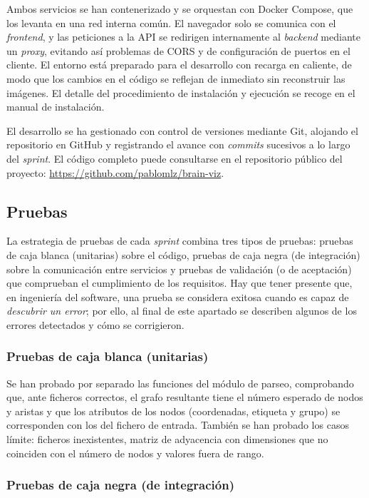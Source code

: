 Ambos servicios se han contenerizado y se orquestan con Docker Compose, que los levanta en una red
interna común. El navegador solo se comunica con el \textit{frontend}, y las peticiones a la API se
redirigen internamente al \textit{backend} mediante un \textit{proxy}, evitando así problemas de
CORS y de configuración de puertos en el cliente. El entorno está preparado para el desarrollo con
recarga en caliente, de modo que los cambios en el código se reflejan de inmediato sin reconstruir las
imágenes. El detalle del procedimiento de instalación y ejecución se recoge en el manual de
instalación.

El desarrollo se ha gestionado con control de versiones mediante Git, alojando el repositorio en
GitHub y registrando el avance con \textit{commits} sucesivos a lo largo del \textit{sprint}. El
código completo puede consultarse en el repositorio público del proyecto:
\url{https://github.com/pablomlz/brain-viz}.

\subsection{Pruebas}

La estrategia de pruebas de cada \textit{sprint} combina tres tipos de pruebas: pruebas de caja
blanca (unitarias) sobre el código, pruebas de caja negra (de integración) sobre la comunicación
entre servicios y pruebas de validación (o de aceptación) que comprueban el cumplimiento de los
requisitos. Hay que tener presente que, en ingeniería del software, una prueba se considera exitosa
cuando es capaz de \emph{descubrir un error}; por ello, al final de este apartado se describen
algunos de los errores detectados y cómo se corrigieron.

\subsubsection*{Pruebas de caja blanca (unitarias)}

Se han probado por separado las funciones del módulo de parseo, comprobando que, ante ficheros
correctos, el grafo resultante tiene el número esperado de nodos y aristas y que los atributos de los
nodos (coordenadas, etiqueta y grupo) se corresponden con los del fichero de entrada. También se han
probado los casos límite: ficheros inexistentes, matriz de adyacencia con dimensiones que no
coinciden con el número de nodos y valores fuera de rango.

\subsubsection*{Pruebas de caja negra (de integración)}

